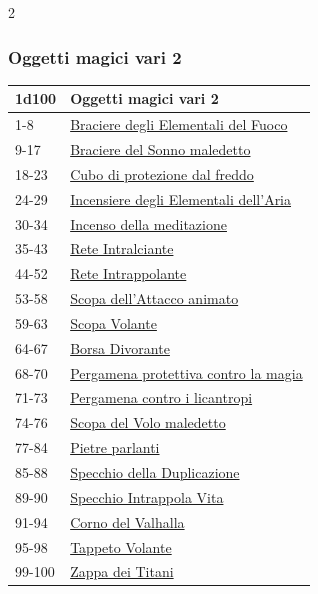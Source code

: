 \begin{multicols}{2}
{\subsubsection{Oggetti magici vari 2}\hypertarget{Oggetti Magici Vari 2}{}

{\small\begin{tabularx}{\linewidth}{ll}
		\toprule
\rowcolor{gray!20}\textbf{1d100} & \textbf{Oggetti magici vari 2}\\
\toprule
1-8 &\hyperlink{Braciere del Comando degli Elementali del Fuoco}{Braciere degli Elementali del Fuoco}\\
\rowcolor{gray!20}9-17 &\hyperlink{Braciere del Sonno maledetto}{Braciere del Sonno maledetto}\\
18-23 & \hyperlink{Cubo di protezione dal freddo}{Cubo di protezione dal freddo}\\
\rowcolor{gray!20}24-29 & \hyperlink{Incensiere degli Elementali dell'Aria}{Incensiere degli Elementali dell'Aria}\\
30-34 & \hyperlink{Incenso della meditazione}{Incenso della meditazione}\\
\rowcolor{gray!20}35-43 & \hyperlink{Rete Intralciante}{Rete Intralciante}\\
44-52 & \hyperlink{Rete Intrappolante}{Rete Intrappolante}\\
\rowcolor{gray!20}53-58 & \hyperlink{Scopa dell'Attacco animato}{Scopa dell'Attacco animato}\\
59-63 & \hyperlink{Scopa Volante}{Scopa Volante}\\
\rowcolor{gray!20}64-67 & \hyperlink{Borsa Divorante}{Borsa Divorante}\\
68-70 & \hyperlink{Pergamena protettiva contro la magia}{Pergamena protettiva contro la magia}\\
\rowcolor{gray!20}71-73 & \hyperlink{Pergamena contro i licantropi}{Pergamena contro i licantropi}\\
74-76 & \hyperlink{Scopa del Volo maledetto}{Scopa del Volo maledetto}\\
\rowcolor{gray!20}77-84 & \hyperlink{Pietre parlanti}{Pietre parlanti}\\
85-88 & \hyperlink{Specchio della Duplicazione}{Specchio della Duplicazione}\\
\rowcolor{gray!20}89-90 & \hyperlink{Specchio Intrappola Vita}{Specchio Intrappola Vita}\\
91-94 & \hyperlink{Corno del Valhalla}{Corno del Valhalla}\\
\rowcolor{gray!20}95-98 & \hyperlink{Tappeto Volante}{Tappeto Volante}\\
99-100 & \hyperlink{Zappa dei Titani}{Zappa dei Titani}
\end{tabularx}}

}
\end{multicols}
